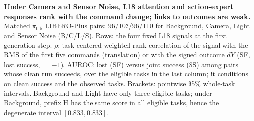 \begin{table}[t]
\caption{\textbf{Under Camera and Sensor Noise, L18 attention and action-expert responses rank with the command change; links to outcomes are weak.} Matched $\pi_{0.5}$ LIBERO-Plus pairs: 96/102/96/110 for Background, Camera, Light and Sensor Noise (B/C/L/S). Rows: the four fixed L18 signals at the first generation step. $\rho$: task-centered weighted rank correlation of the signal with the RMS of the first five commands (translation) or with the signed outcome $dY$ (SF, lost success, $=-1$). AUROC: lost (SF) versus joint success (SS) among pairs whose clean run succeeds, over the eligible tasks in the last column; it conditions on clean success and the observed tasks. Brackets: pointwise 95\% whole-task intervals. Background and Light have only three eligible tasks; under Background, prefix H has the same score in all eligible tasks, hence the degenerate interval $[0.833,0.833]$.}


\end{table}
